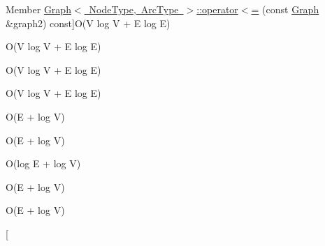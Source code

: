 \begin{DoxyRefList}
%
Member \mbox{\hyperlink{classGraph_a352607f2b21dd87b3d2a3957bbf3da7b}{Graph$<$ Node\+Type, Arc\+Type $>$\+:\+:operator$<$=}} (const \mbox{\hyperlink{classGraph}{Graph}} \&graph2) const]O(V log V + E log E)  
\item[\label{BigOh__BigOh000093}%
\Hypertarget{BigOh__BigOh000093}%
Member \mbox{\hyperlink{classGraph_a188f85939e3fe6ed2d411f622287f722}{Graph$<$ Node\+Type, Arc\+Type $>$\+:\+:operator==}} (const \mbox{\hyperlink{classGraph}{Graph}} \&graph2) const]O(V log V + E log E)  
\item[\label{BigOh__BigOh000097}%
\Hypertarget{BigOh__BigOh000097}%
Member \mbox{\hyperlink{classGraph_a8019cf2c98949fd509193cf26ba2ff8a}{Graph$<$ Node\+Type, Arc\+Type $>$\+:\+:operator$>$}} (const \mbox{\hyperlink{classGraph}{Graph}} \&graph2) const]O(V log V + E log E)  
\item[\label{BigOh__BigOh000098}%
\Hypertarget{BigOh__BigOh000098}%
Member \mbox{\hyperlink{classGraph_ab1ca2af20f3b0251972b72295270212e}{Graph$<$ Node\+Type, Arc\+Type $>$\+:\+:operator$>$=}} (const \mbox{\hyperlink{classGraph}{Graph}} \&graph2) const]O(V log V + E log E)  
\item[\label{BigOh__BigOh000084}%
\Hypertarget{BigOh__BigOh000084}%
Member \mbox{\hyperlink{classGraph_af6370fb52d2dab4eb7795da22c33dd02}{Graph$<$ Node\+Type, Arc\+Type $>$\+:\+:remove\+Arc}} (const std\+::string \&s1, const std\+::string \&s2)]O(E + log V)  
\item[\label{BigOh__BigOh000085}%
\Hypertarget{BigOh__BigOh000085}%
Member \mbox{\hyperlink{classGraph_ae0c9f44b20b49ffae9fecc0a4f156ac1}{Graph$<$ Node\+Type, Arc\+Type $>$\+:\+:remove\+Arc}} (Node\+Type $\ast$n1, Node\+Type $\ast$n2)]O(E + log V)  
\item[\label{BigOh__BigOh000086}%
\Hypertarget{BigOh__BigOh000086}%
Member \mbox{\hyperlink{classGraph_a9d6580d1b0228fe6c1a02dfe70de1abf}{Graph$<$ Node\+Type, Arc\+Type $>$\+:\+:remove\+Arc}} (Arc\+Type $\ast$arc)]O(log E + log V)  
\item[\label{BigOh__BigOh000087}%
\Hypertarget{BigOh__BigOh000087}%
Member \mbox{\hyperlink{classGraph_a2d5f7ee89176144ed4c5c6b08a233aa6}{Graph$<$ Node\+Type, Arc\+Type $>$\+:\+:remove\+Node}} (const std\+::string \&name)]O(E + log V)  
\item[\label{BigOh__BigOh000088}%
\Hypertarget{BigOh__BigOh000088}%
Member \mbox{\hyperlink{classGraph_a2dfe63019975561914e0ed79551de108}{Graph$<$ Node\+Type, Arc\+Type $>$\+:\+:remove\+Node}} (Node\+Type $\ast$node)]O(E + log V)  
\item[\label{BigOh__BigOh000089}%

\end{DoxyRefList}
